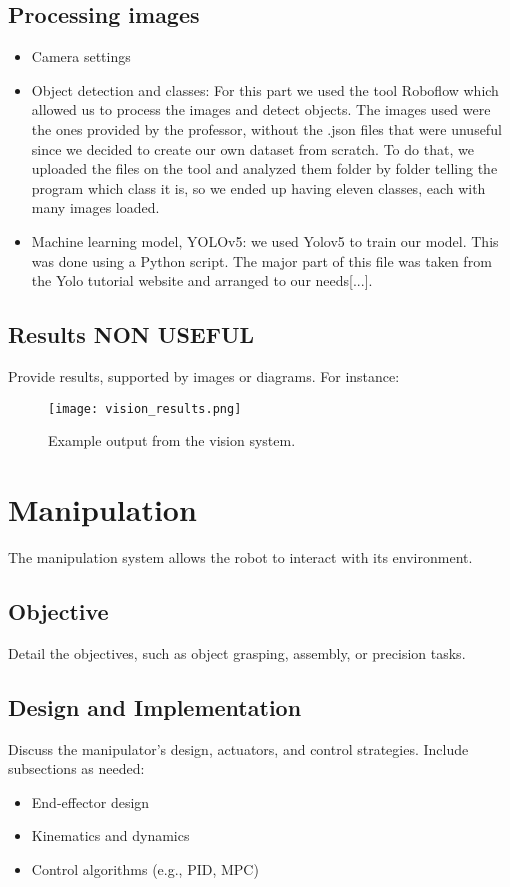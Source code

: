 \documentclass[12pt,a4paper]{article}
\begin{document}
\subsection{Processing images}
\begin{itemize}
    \item Camera settings
    \item Object detection and classes: For this part we used the tool Roboflow which allowed us to process the images and detect objects. The images used were the ones provided by the professor, without the .json files that were unuseful since we decided to create our own dataset from scratch. To do that, we uploaded the files on the tool and analyzed them folder by folder telling the program which class it is, so we ended up having eleven classes, each with many images loaded. 
    \item Machine learning model, YOLOv5: we used Yolov5 to train our model. This was done using a Python script. The major part of this file was taken from the Yolo tutorial website and arranged to our needs[...]. 
\end{itemize}


\subsection{Results NON USEFUL}
Provide results, supported by images or diagrams. For instance:
\begin{figure}[h!]
    \centering
    \texttt{[image: vision\_results.png]} %
    \caption{Example output from the vision system.}
    \label{fig:vision_results}
\end{figure}

\section{Manipulation}
The manipulation system allows the robot to interact with its environment. 
\subsection{Objective}
Detail the objectives, such as object grasping, assembly, or precision tasks.

\subsection{Design and Implementation}
Discuss the manipulator's design, actuators, and control strategies. Include subsections as needed:
\begin{itemize}
    \item End-effector design
    \item Kinematics and dynamics
    \item Control algorithms (e.g., PID, MPC)
\end{itemize}
\end{document}
